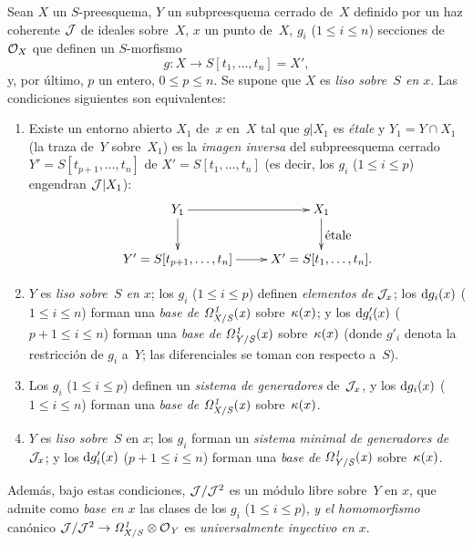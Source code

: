 
\begin{proposition}
\label{II.4.9}
Sean $X$ un $S$-preesquema, $Y$ un subpreesquema cerrado de~$X$ definido por un haz coherente $\cal{J}$ de ideales sobre~$X$, $x$ un punto de~$X$, $g_i$ ($1\leq i\leq n$) secciones de~$\cal{O}_X$ que definen un $S$-morfismo
\[
g\colon X\to S[t_1,\dots,t_n]=X',
\]
y, por último, $p$ un entero, $0\leq p\leq n$. Se supone que $X$ es \emph{liso sobre~$S$ en $x$}. Las condiciones siguientes son equivalentes:
\begin{enumerate}
\item[(i)] Existe un entorno abierto $X_1$ de~$x$ en~$X$ tal que $g|X_1$ es \emph{étale} y $Y_1=Y\cap X_1$ (la traza de~$Y$ sobre~$X_1$) es la \emph{imagen inversa} del subpreesquema cerrado $Y'=S[t_{p+1},\dots,t_n]$ de $X'=S[t_1,\dots,t_n]$ (es decir, los $g_i$ ($1\leq i\leq p$) engendran $\cal{J}|X_1$):
\[
\xymatrix{Y_1 \ar[d] \ar[r] & X_1 \ar[d]^{\hbox{étale}} \\
Y'=S[t_{p+1},\dots,t_n] \ar[r] & X'=S[t_1,\dots,t_n].}
\]
\item[(ii)]
$Y$
es \emph{liso sobre~$S$ en $x$}; los $g_i$ ($1\leq i\leq p$) definen \emph{elementos de} $\cal{J}_x$; los $\rd g_i(x)$ ($1\leq i\leq n$) forman una \emph{base de} $\it{\Omega}^1_{X/S}(x)$ sobre~$\kres(x)$; y los $\rd g'_i(x)$ ($p+1\leq i\leq n$) forman una \emph{base de} $\it{\Omega}^1_{Y/S}(x)$ sobre~$\kres(x)$ (donde $g'_i$ denota la restricción de $g_i$ a~$Y$; las diferenciales se toman con respecto a~$S$).
\item[(iii)] Los $g_i$ ($1\leq i\leq p$) definen un \emph{sistema de generadores} de~$\cal{J}_x$, y los $\rd g_i(x)$ ($1\leq i\leq n$) forman una \emph{base de} $\it{\Omega}^1_{X/S}(x)$ sobre~$\kres(x)$.
\item[(iv)] $Y$ es \emph{liso sobre~$S$} en $x$; los $g_i$
forman un \emph{sistema minimal de generadores de} $\cal{J}_x$; y los $\rd g'_i(x)$ ($p+1\leq i\leq n$) forman una \emph{base de} $\it{\Omega}^1_{Y/S}(x)$ sobre~$\kres(x)$.
\end{enumerate}

Además, bajo estas condiciones, $\cal{J}/\cal{J}^2$ es un módulo libre sobre~$Y$ en $x$, que admite como \emph{base en $x$} las clases de los $g_i$ ($1\leq i\leq p$), \emph{y el homomorfismo} canónico $\cal{J}/\cal{J}^2\to\it{\Omega}^1_{X/S}\otimes\cal{O}_Y$ es \emph{universalmente inyectivo en $x$}.
\end{proposition}

